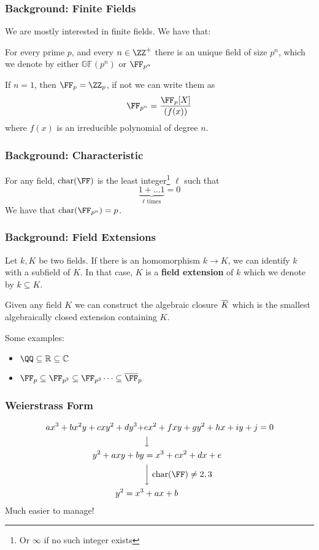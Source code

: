 \documentclass{beamer}
\newcommand{\overbar}[1]{\mkern 1.5mu\overline{\mkern-1.5mu#1\mkern-1.5mu}\mkern 1.5mu}
\begin{document}
\begin{frame}
    \frametitle{Background: Finite Fields}
    We are mostly interested in finite fields. We have that:
    \begin{theorem}
        For every prime $p$, and every $n \in \ZZ^+$ there is an unique field of size $p^n$, which we denote 
        by either $\mathbb{GF}(p^n)$ or $\FF_{p^n}$
    \end{theorem}

    If $n = 1$, then $\FF_{p} = \ZZ_p$, if not we can write them as
    \[ \FF_{p^n} = \frac{\FF_{p}[X]}{(f(x))} \]
    where $f(x)$ is an irreducible polynomial of degree $n$.
\end{frame}

\begin{frame}
    \frametitle{Background: Characteristic}
    For any field, $\mathrm{char}(\FF)$ is the least integer\footnote{Or $\infty$ if no such integer exists} $\ell$ such that 
    \[ \underbrace{1 + \dots 1}_{\ell \text{ times}} = 0 \]
    We have that $\mathrm{char}(\FF_{p^n}) = p$. 
\end{frame}

\begin{frame}
    \frametitle{Background: Field Extensions}
    Let $k, K$ be two fields. If there is an homomorphism $k \to K$, we can identify $k$ with a subfield of $K$. 
    In that case, $K$ is a \textbf{field extension} of $k$ which we denote by $k \subseteq K$. 

    Given any field $K$ we can construct the algebraic closure $\overbar{K}$ which is the smallest algebraically closed extension containing $K$.

    Some examples:
    \begin{itemize}
        \item $\QQ \subseteq \mathbb{R} \subseteq \mathbb{C}$
        \item $\FF_p \subseteq \FF_{p^2} \subseteq \FF_{p^3} \dots \subseteq \overline{\FF}_{p}$
    \end{itemize}
\end{frame}

\begin{frame}
    \frametitle{Weierstrass Form} 
    \begin{align*}
        a x^3 + b x^2 y + c x y^2 + d y^3 +& e x^2 + f x y + g y^2 + h x + i y + j = 0 \\
        &\big\downarrow \\
        y^2 + a xy + b y &= x^3 + c x^2 + d x + e \\
        &\bigg\downarrow \; \mathrm{char}(\FF) \neq 2, 3 \\
        y^2 = x^3 &+ a x + b
    \end{align*}
    Much easier to manage!
\end{frame}
\end{document}
